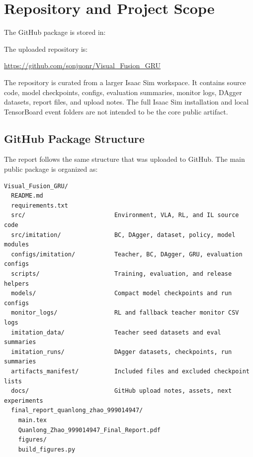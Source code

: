 \documentclass[11pt]{article}
\begin{document}
\section{Repository and Project Scope}

The GitHub package is stored in:

\begin{center}
\end{center}

The uploaded repository is:

\begin{center}
\url{https://github.com/sonjuonr/Visual_Fusion_GRU}
\end{center}

The repository is curated from a larger Isaac Sim workspace. It contains source
code, model checkpoints, configs, evaluation summaries, monitor logs, DAgger
datasets, report files, and upload notes. The full Isaac Sim installation and
local TensorBoard event folders are not intended to be the core public
artifact.

\subsection{GitHub Package Structure}

The report follows the same structure that was uploaded to GitHub. The main
public package is organized as:

{\small
\begin{verbatim}
Visual_Fusion_GRU/
  README.md
  requirements.txt
  src/                         Environment, VLA, RL, and IL source code
  src/imitation/               BC, DAgger, dataset, policy, model modules
  configs/imitation/           Teacher, BC, DAgger, GRU, evaluation configs
  scripts/                     Training, evaluation, and release helpers
  models/                      Compact model checkpoints and run configs
  monitor_logs/                RL and fallback teacher monitor CSV logs
  imitation_data/              Teacher seed datasets and eval summaries
  imitation_runs/              DAgger datasets, checkpoints, run summaries
  artifacts_manifest/          Included files and excluded checkpoint lists
  docs/                        GitHub upload notes, assets, next experiments
  final_report_quanlong_zhao_999014947/
    main.tex
    Quanlong_Zhao_999014947_Final_Report.pdf
    figures/
    build_figures.py
\end{verbatim}
}
\end{document}
